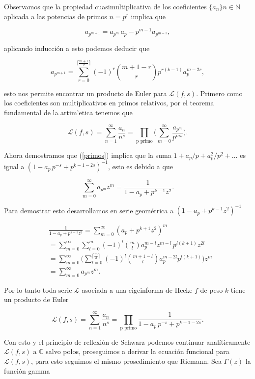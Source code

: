 \documentclass[letterpaper]{report}
\newcommand{\nat}{\ensuremath{ \mathbb N }}
\newcommand{\co}{\ensuremath{\mathbb C }}
\newcommand{\ga}{\ensuremath{\Gamma}}
\begin{document}
Observamos que la propiedad cuasimultiplicativa de los coeficientes $\lbrace a_n\rbrace{n\in\nat}$ aplicada a las potencias de primos $n=p^r$ implica que

$$
a_{p^{m+1}}=a_{p^m}\,a_p-p^{m-1}a_{p^{m-1}},
$$

\noindent aplicando inducción a esto podemos deducir que

\begin{equation}\label{primos}
a_{p^{m+1}}=\sum_{r=0}^{\lceil\frac{m+1}{2}\rceil}(-1)^r \binom{m+1-r}{r} p^{r(k-1)}a_p^{m-2r},
\end{equation}

\noindent esto nos permite encontrar un producto de Euler para $\mathcal{L}(f,s)$. Primero como los coeficientes son multiplicativos en primos relativos, por el teorema fundamental de la artim'etica tenemos que

$$
\mathcal{L}(f,s)=\sum_{n=1}^{\infty}\frac{a_n}{n^s}=
\prod_{\textrm{p primo}}\Big(\sum_{m=0}^{\infty}\frac{a_{p^m}}{p^{ms}}\Big).
$$

Ahora demostramos que (\ref{primos}) implica que la suma $1+a_p/p+a_p^2/p^2+\ldots$ es igual a $(1-a_p\,p^{-s}+p^{k-1-2s})^{-1}$, esto es debido a que

$$
\sum_{m=0}^{\infty}a_{p^m}z^{m}=\frac{1}{1-a_p+p^{k-1}z^2}.
$$

\noindent Para demostrar esto desarrollamos en serie geométrica a $(1-a_p+p^{k-1}z^2)^{-1}$

\begin{align*}
&\frac{1}{1-a_p+p^{k-1}z^2} 
= \sum_{m=0}^{\infty}(a_p+p^{k+1}z^2)^m \\
& = \sum_{m=0}^{\infty}\sum_{l=0}^m(-1)^l\binom{m}{l}a_p^{m-l}z^{m-l}\,p^{l(k+1)}z^{2l} \\
& = \sum_{m=0}^{\infty}\Big(\sum_{l=0}^{\lceil\frac{m}{2}\rceil}(-1)^l\binom{m+1-l}{l}a_p^{m-2l}p^{l(k+1)}\Big)z^{m}\\ 
& = \sum_{m=0}^{\infty}a_{p^m}z^{m}.
\end{align*}

Por lo tanto toda serie $\mathcal{L}$ asociada a una eigeinforma de Hecke $f$ de peso $k$ tiene un producto de Euler

\begin{equation}
\mathcal{L}(f,s)=\sum_{n=1}^{\infty}\frac{a_n}{n^s}=
\prod_{\textrm{p primo}}\frac{1}{1-a_p\,p^{-s}+p^{k-1-2s}}.
\end{equation} 

Con esto y el principio de reflexión de Schwarz podemos continuar analíticamente $\mathcal{L}(f,s)$ a $\co$ salvo polos, proseguimos a derivar la ecuación funcional para $\mathcal{L}(f,s)$, para esto seguimos el mismo prosedimiento que Riemann. Sea $\ga(z)$ la función gamma
\end{document}
